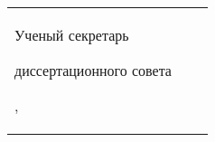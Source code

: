 {\vspace{0.017\paperheight}
\par\bigskip
\noindent%
\begin{tabularx}{\textwidth}{@{}%
>{\raggedright\arraybackslash}b{18em}
>{\centering\arraybackslash}X
r
@{}}
    Ученый секретарь\par
    диссертационного совета\par
    ,\par
    &
    &
\end{tabularx} 

}
